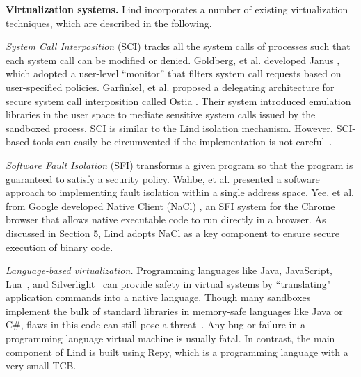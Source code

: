 
\textbf{Virtualization systems.}
Lind incorporates a number of existing virtualization techniques, which are
described in the following.

\textit{System Call Interposition} (SCI) tracks all the system calls of processes such 
that each system call can be modified or denied.
Goldberg, et al. developed Janus \cite{Janus0:96, Janus:99}, 
which adopted a user-level ``monitor'' that filters system call requests based on
user-specified policies. Garfinkel, et al. proposed a delegating architecture for secure system call interposition 
called Ostia \cite{SCI-04}. Their system introduced emulation libraries in the user space
to mediate sensitive system calls issued by the sandboxed process. SCI is similar to
 the Lind isolation mechanism. However, SCI-based tools can easily be circumvented
 if the implementation is not careful~\cite{Problems-SCI}.

\textit{Software Fault Isolation} (SFI) transforms a given program so that the
program is guaranteed to satisfy a security policy.
Wahbe, et al. \cite{SFI:93} presented a software approach to implementing
fault isolation within a single address space.
Yee, et al. from Google developed Native Client (NaCl) \cite{NaCl-09},
an SFI system for the Chrome browser that allows native executable code to run directly in a
browser. As discussed in Section 5, Lind adopts NaCl as a key component to ensure secure execution
of binary code.

\textit{Language-based virtualization.}
Programming languages like Java, JavaScript, Lua~\cite{Lua}, and
Silverlight~\cite{Silverlight} can provide safety in virtual systems by
``translating" application commands into a native language.
%
Though many sandboxes implement the bulk of standard libraries in
memory-safe languages like Java or C\#, flaws in this code can
still pose a threat~\cite{JavaBugs, Java-Lessons}.
Any bug or failure in a programming language virtual
machine is usually fatal. In contrast, the main component of Lind
is built using Repy, which is a programming language with a very small TCB.


